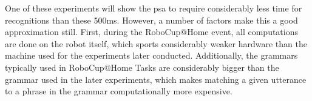 One of these experiments will show the \gls{psa} to require considerably less time for recognitions than these 500ms.
However, a number of factors make this a good approximation still.
First, during the RoboCup@Home event, all computations are done on the robot itself, which sports considerably weaker hardware than the machine used for the experiments later conducted.
Additionally, the grammars typically used in RoboCup@Home Tasks are considerably bigger than the grammar used in the later experiments, which makes matching a given utterance to a phrase in the grammar computationally more expensive.